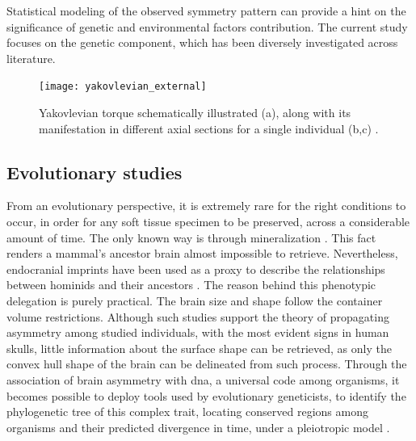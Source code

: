 Statistical modeling of the observed symmetry pattern can provide a hint on the significance  of genetic and environmental factors contribution\cite{Klingenberg2020}. The current study focuses on the genetic component, which has been diversely investigated across literature.


\begin{figure}
	\centering
%		
\centering
\texttt{[image: yakovlevian\_external]}
\caption[Yakovlevian Torque \cite{Kuo2022}]{Yakovlevian torque schematically illustrated (a), along with its manifestation in different axial sections for a single individual (b,c) \cite{Kuo2022}.}
\label{fig:yaktorque}
\end{figure}

\subsection{Evolutionary studies}
From an evolutionary perspective, it is extremely rare for the right conditions to occur, in order for any soft tissue specimen to be preserved, across a considerable amount of time. The only known way is through mineralization \cite{Purnell2018}. This fact renders a mammal's ancestor brain almost impossible to retrieve. Nevertheless, endocranial imprints have been used as a proxy to describe the relationships between hominids and their ancestors \cite{Balzeau2012,Neubauer2020}. The reason behind this phenotypic delegation is purely practical. The brain size and shape follow the container volume restrictions. Although such studies support the theory of propagating asymmetry among studied individuals, with the most evident signs in human skulls, little information about the surface shape can be retrieved, as only the convex hull shape of the brain can be delineated from such process. Through the association of brain asymmetry with \acs{dna}, a universal code among organisms, it becomes possible to deploy tools used by evolutionary geneticists, to identify the phylogenetic tree of this complex trait, locating conserved regions among organisms and their predicted divergence in time, under a pleiotropic model \cite{Koch2021}.


